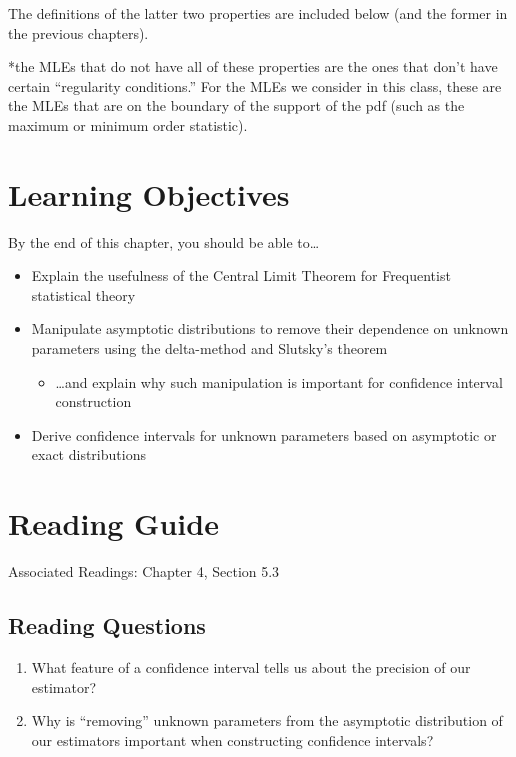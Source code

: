 \documentclass[
  letterpaper,
  DIV=11,
  numbers=noendperiod]{scrreprt}
\providecommand{\tightlist}{%
  \setlength{\itemsep}{0pt}\setlength{\parskip}{0pt}}\usepackage{longtable,booktabs,array}
\begin{document}
The definitions of the latter two properties are included below (and the
former in the previous chapters).

*the MLEs that do not have all of these properties are the ones that
don't have certain ``regularity conditions.'' For the MLEs we consider
in this class, these are the MLEs that are on the boundary of the
support of the pdf (such as the maximum or minimum order statistic).

\hypertarget{learning-objectives-5}{%
\section{Learning Objectives}\label{learning-objectives-5}}

By the end of this chapter, you should be able to\ldots{}

\begin{itemize}
\item
  Explain the usefulness of the Central Limit Theorem for Frequentist
  statistical theory
\item
  Manipulate asymptotic distributions to remove their dependence on
  unknown parameters using the delta-method and Slutsky's theorem

  \begin{itemize}
  \tightlist
  \item
    \ldots and explain why such manipulation is important for confidence
    interval construction
  \end{itemize}
\item
  Derive confidence intervals for unknown parameters based on asymptotic
  or exact distributions
\end{itemize}

\hypertarget{reading-guide-5}{%
\section{Reading Guide}\label{reading-guide-5}}

Associated Readings: Chapter 4, Section 5.3

\hypertarget{reading-questions-5}{%
\subsection{Reading Questions}\label{reading-questions-5}}

\begin{enumerate}
\def\labelenumi{\arabic{enumi}.}
\item
  What feature of a confidence interval tells us about the precision of
  our estimator?
\item
  Why is ``removing'' unknown parameters from the asymptotic
  distribution of our estimators important when constructing confidence
  intervals?
\end{enumerate}
\end{document}
